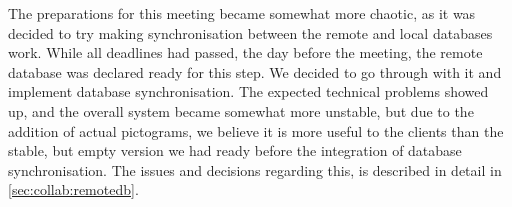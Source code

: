 The preparations for this meeting became somewhat more chaotic, as it was decided to try making synchronisation between the remote and local databases work. While all deadlines had passed, the day before the meeting, the remote database was declared ready for this step. We decided to go through with it and implement database synchronisation. The expected technical problems showed up, and the overall system became somewhat more unstable, but due to the addition of actual pictograms, we believe it is more useful to the clients than the stable, but empty version we had ready before the integration of database synchronisation. The issues and decisions regarding this, is described in detail in \cref{sec:collab:remotedb}.

